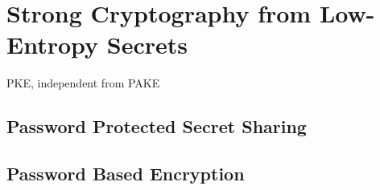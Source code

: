\section{Strong Cryptography from Low-Entropy Secrets}
PKE, independent from PAKE

\subsection{Password Protected Secret Sharing}

\subsection{Password Based Encryption}

%
%
%
%
